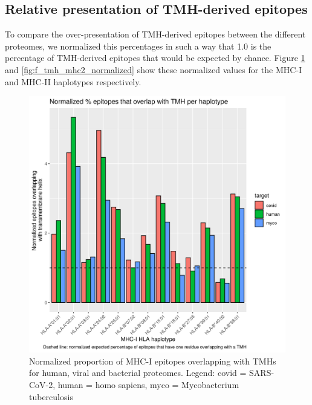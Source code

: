 

\subsection{Relative presentation of TMH-derived epitopes}

To compare the over-presentation of TMH-derived epitopes between the
different proteomes, we normalized this percentages in such a
way that 1.0 is the percentage of TMH-derived epitopes that would 
be expected by chance. 
Figure \ref{fig:f_tmh_mhc1_normalized} and \ref{fig:f_tmh_mhc2_normalized}
show these normalized values for the MHC-I and MHC-II haplotypes respectively.

\begin{figure}[!htbp]
  \includegraphics[width=\textwidth]{bbbq_1_smart_results/fig_f_tmh_mhc1_2_normalized.png}
  \caption{
    Normalized proportion of MHC-I epitopes overlapping with TMHs
    for human, viral and bacterial proteomes.
    Legend: covid = SARS-CoV-2,
    human = homo sapiens, myco = Mycobacterium tuberculosis
  }
  \label{fig:f_tmh_mhc1_normalized}
\end{figure}

